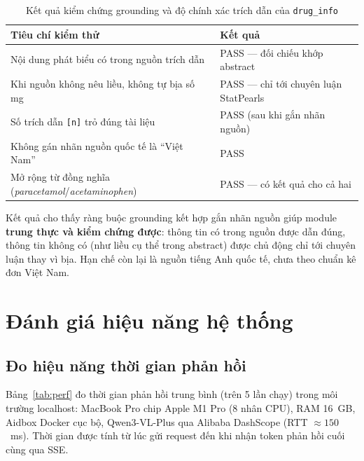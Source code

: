 \documentclass[a4paper,13pt,3p,twoside,openany]{report}
\theoremstyle{definition}
\theoremstyle{remark}
\theoremstyle{definition}
\let\ORIGsection\section
\let\ORIGsubsection\subsection
\renewcommand{\section}{\needspace{3\baselineskip}\ORIGsection}
\renewcommand{\subsection}{\needspace{3\baselineskip}\ORIGsubsection}
\begin{document}
\begin{table}[H]
\centering
\begin{tabular}{|p{6.5cm}|p{6.0cm}|}
\hline
\textbf{Tiêu chí kiểm thử} & \textbf{Kết quả} \\
\hline
Nội dung phát biểu có trong nguồn trích dẫn & PASS --- đối chiếu khớp abstract \\
\hline
Khi nguồn không nêu liều, không tự bịa số mg & PASS --- chỉ tới chuyên luận StatPearls \\
\hline
Số trích dẫn \texttt{[n]} trỏ đúng tài liệu & PASS (sau khi gắn nhãn nguồn) \\
\hline
Không gán nhãn nguồn quốc tế là ``Việt Nam'' & PASS \\
\hline
Mở rộng từ đồng nghĩa (\textit{paracetamol}/\textit{acetaminophen}) & PASS --- có kết quả cho cả hai \\
\hline
\end{tabular}
\caption{Kết quả kiểm chứng grounding và độ chính xác trích dẫn của \texttt{drug\_info}}
\label{tab:druginfo-test}
\end{table}

Kết quả cho thấy ràng buộc grounding kết hợp gắn nhãn nguồn giúp module \textbf{trung thực và kiểm chứng được}: thông tin có trong nguồn được dẫn đúng, thông tin không có (như liều cụ thể trong abstract) được chủ động chỉ tới chuyên luận thay vì bịa. Hạn chế còn lại là nguồn tiếng Anh quốc tế, chưa theo chuẩn kê đơn Việt Nam.

\section{Đánh giá hiệu năng hệ thống}

\subsection{Đo hiệu năng thời gian phản hồi}

Bảng~\ref{tab:perf} đo thời gian phản hồi trung bình (trên 5 lần chạy) trong môi trường localhost: MacBook Pro chip Apple M1 Pro (8 nhân CPU), RAM 16~GB, Aidbox Docker cục bộ, Qwen3-VL-Plus qua Alibaba DashScope (RTT $\approx 150$~ms). Thời gian được tính từ lúc gửi request đến khi nhận token phản hồi cuối cùng qua SSE.
\end{document}

